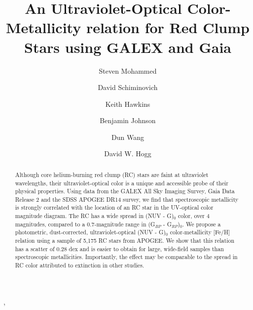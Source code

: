 \documentclass[twocolumn]{emulateapj}
\begin{document}
\title{An Ultraviolet-Optical Color-Metallicity relation for Red Clump Stars using GALEX and Gaia}

\author{Steven Mohammed}

\author{David Schiminovich}

\author{Keith Hawkins}

\author{Benjamin Johnson}

\author{Dun Wang}
, 

\author{David W. Hogg}




\begin{abstract}
Although core helium-burning red clump (RC) stars are faint at ultraviolet wavelengths, their ultraviolet-optical color is a unique and accessible probe of their physical properties. Using data from the GALEX All Sky Imaging Survey, Gaia Data Release 2 and the SDSS APOGEE DR14 survey, we find that spectroscopic metallicity is strongly correlated with the location of an RC star in the UV-optical color magnitude diagram.  The RC has a wide spread in (NUV - G)$_0$ color, over 4 magnitudes, compared to a 0.7-magnitude range in (G$_{BP}$ - G$_{RP}$)$_0$. We propose a photometric, dust-corrected, ultraviolet-optical (NUV - G)$_0$ color-metallicity [Fe/H] relation using a sample of 5,175 RC stars from APOGEE. We show that this relation has a scatter of 0.28 dex and is easier to obtain for large, wide-field samples than spectroscopic metallicities. Importantly, the effect may be comparable to the spread in RC color attributed to extinction in other studies.
\end{abstract}
 
\end{document}
